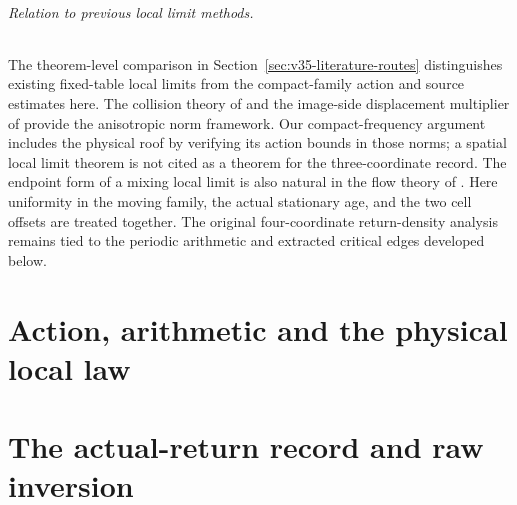 \documentclass[11pt,reqno]{amsart}
\numberwithin{equation}{section}
\theoremstyle{definition}\newtheorem{definition}[theorem]{Definition}
\theoremstyle{remark}\newtheorem{remark}[theorem]{Remark}
\begin{document}
\paragraph{Relation to previous local limit methods.}
The theorem-level comparison in Section~\ref{sec:v35-literature-routes} distinguishes existing fixed-table local limits from the compact-family action and source estimates here. The collision theory of \cite{DZ11,DZ} and the image-side displacement
multiplier of \cite{DPZ} provide the anisotropic norm framework.
Our compact-frequency argument includes the physical roof by verifying
its action bounds in those norms; a spatial local limit theorem is not
cited as a theorem for the three-coordinate record. The endpoint form
of a mixing local limit is also natural in the flow theory of
\cite{DN}. Here uniformity in the moving family, the actual stationary
age, and the two cell offsets are treated together. The original
four-coordinate return-density analysis remains tied to the periodic
arithmetic and extracted critical edges developed below.

\part{Action, arithmetic and the physical local law}









\part{The actual-return record and raw inversion}
\end{document}

